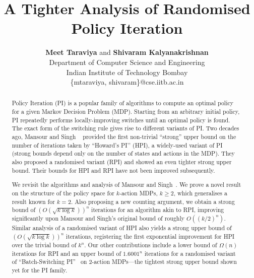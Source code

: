 \documentclass[letterpaper]{article}
\title{A Tighter Analysis of Randomised Policy Iteration}
\author{ {\bf Meet Taraviya} {\normalfont and} {\bf Shivaram Kalyanakrishnan} \\
Department of Computer Science and Engineering\\ Indian Institute of Technology Bombay\\
\{mtaraviya,  shivaram\}@cse.iitb.ac.in \\
}
\begin{document}
\maketitle

\begin{abstract}
\vspace{-5pt}
Policy Iteration (PI) is a popular family of algorithms to compute an optimal policy for a given Markov Decision Problem (MDP). Starting from an arbitrary initial policy, PI repeatedly performs locally-improving switches until an optimal policy is found. The exact form of the switching rule gives rise to different variants of PI. Two decades ago, Mansour and Singh ~ provided the first non-trivial ``strong'' upper bound on the number of iterations taken by ``Howard’s PI’’ (HPI), a widely-used variant of PI (strong bounds depend only on the number of states and actions in the MDP). They also proposed a randomised variant (RPI) and showed an even tighter strong upper bound. Their bounds for HPI and RPI have not been improved subsequently.


We revisit the algorithms and analysis of Mansour and Singh~. We prove a novel result on the structure of the policy space
for $k$-action MDPs, $k \geq 2$, which generalises a result known for $k = 2$. Also proposing a new counting argument, we obtain a strong bound of $(O(\sqrt{k \log k }))^{n}$ iterations for an algorithm akin to RPI, improving significantly upon Mansour and Singh's original bound of roughly $O((k/2)^{n})$. Similar analysis of a randomised variant of HPI also yields a strong upper bound of $(O(\sqrt{k \log k }))^{n}$ iterations, registering the first exponential improvement for HPI over the trivial bound of $k^{n}$. Our other contributions include a lower bound of $\Omega(n)$ iterations for RPI and an upper bound of $1.6001^{n}$ iterations for a randomised variant of ``Batch-Switching PI''~\cite{Kalyanakrishnan+MG-bspi:2016} on $2$-action MDPs---the tightest strong upper bound shown yet for the PI family.
\end{abstract}











\clearpage

\end{document}
